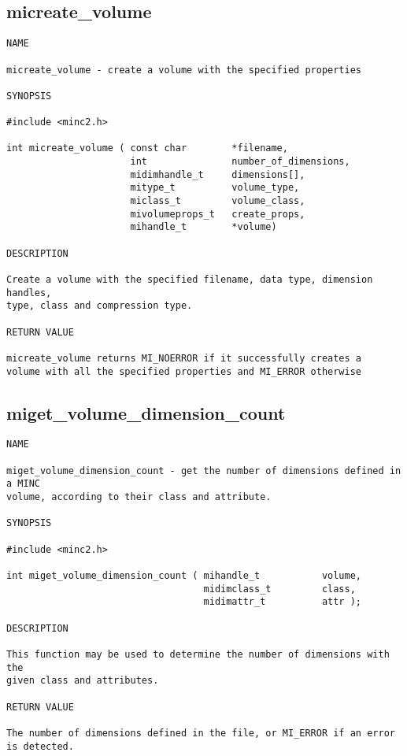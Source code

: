 \documentclass{article}
\begin{document}
\subsection{micreate\_volume}
\begin{verbatim}
NAME

micreate_volume - create a volume with the specified properties

SYNOPSIS

#include <minc2.h>

int micreate_volume ( const char        *filename,
                      int               number_of_dimensions,
                      midimhandle_t     dimensions[],
                      mitype_t          volume_type,
                      miclass_t         volume_class,
                      mivolumeprops_t   create_props,
                      mihandle_t        *volume)

DESCRIPTION

Create a volume with the specified filename, data type, dimension handles,
type, class and compression type.

RETURN VALUE

micreate_volume returns MI_NOERROR if it successfully creates a
volume with all the specified properties and MI_ERROR otherwise
\end{verbatim}

\subsection{miget\_volume\_dimension\_count}
\begin{verbatim}
NAME

miget_volume_dimension_count - get the number of dimensions defined in a MINC
volume, according to their class and attribute.

SYNOPSIS

#include <minc2.h>

int miget_volume_dimension_count ( mihandle_t           volume, 
                                   midimclass_t         class,
                                   midimattr_t          attr );

DESCRIPTION

This function may be used to determine the number of dimensions with the
given class and attributes.

RETURN VALUE

The number of dimensions defined in the file, or MI_ERROR if an error
is detected.
\end{verbatim}
\end{document}
